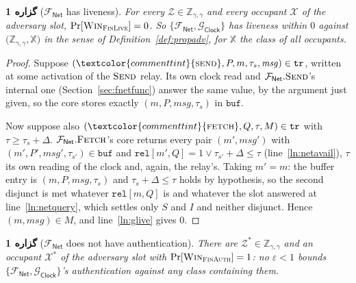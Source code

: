 \documentclass[10pt,oneside,openany]{book}
\newcommand{\Zenv}{\mathcal{Z}}
\newcommand{\ZenvSet}{\mathbb{Z}}
\newcommand{\op}[1]{\textnormal{\textsc{#1}}}
\newcommand{\atom}[1]{\textcolor{commenttint}{\op{#1}}}
\newcommand{\Xset}{\mathbb{X}}
\newcommand{\Win}{\op{Win}}
\newcommand{\Gclock}{\mathcal{G}_{\mathsf{Clock}}}
\newcommand{\Fnet}{\mathcal{F}_{\mathsf{Net}}}
\newcommand{\msg}{\mathit{msg}}
\newcommand{\V}[1]{\mathtt{#1}}
\theoremstyle{accentdef}
\theoremstyle{accentplain}
\newtheorem{proposition}[definition]{گزاره}
\begin{document}
\begin{proposition}[$\Fnet$ has liveness]\label{prop:netlive}
For every $\Zenv \in \ZenvSet_{\gamma,\gamma}$ and every occupant $\mathcal{X}$ of the adversary
slot, $\Pr[\Win_{\op{FinLive}}] = 0$. So $\{\Fnet,\Gclock\}$ has liveness within $0$ against
$\bigl(\ZenvSet_{\gamma,\gamma},\Xset\bigr)$ in the sense of Definition~\ref{def:propadv}, for
$\Xset$ the class of all occupants.
\end{proposition}

\begin{proof}
Suppose $(\atom{send},P,m,\tau_s,\msg) \in \V{tr}$, written at some activation of the $\op{Send}$
relay. Its own clock read and $\Fnet.\op{Send}$'s internal one (Section~\ref{sec:fnetfunc})
answer the same value, by the argument just given, so the core stores exactly $(m,P,\msg,\tau_s)$
in $\V{buf}$.

Now suppose also $(\atom{fetch},Q,\tau,M) \in \V{tr}$ with $\tau \geq \tau_s + \Delta$.
$\Fnet.\op{Fetch}$'s core returns every pair $(m',\msg')$ with $(m',P',\msg',\tau_{s'}) \in \V{buf}$
and $\V{rel}[m',Q] = 1 \vee \tau_{s'} + \Delta \leq \tau$ (line~\ref{ln:netavail}), $\tau$ its own
reading of the clock and, again, the relay's. Taking $m' = m$: the buffer entry is
$(m,P,\msg,\tau_s)$ and $\tau_s + \Delta \leq \tau$ holds by hypothesis, so the second disjunct is
met whatever $\V{rel}[m,Q]$ is and whatever the slot answered at line~\ref{ln:netquery}, which
settles only $S$ and $I$ and neither disjunct. Hence $(m,\msg) \in M$, and line~\ref{ln:glive}
gives $0$.
\end{proof}

\begin{proposition}[$\Fnet$ does not have authentication]\label{prop:netauth}
There are $\Zenv^{*} \in \ZenvSet_{\gamma,\gamma}$ and an occupant $\mathcal{X}^{*}$ of the
adversary slot with $\Pr[\Win_{\op{FinAuth}}] = 1$: no $\varepsilon < 1$ bounds
$\{\Fnet,\Gclock\}$'s
authentication against any class containing them.
\end{proposition}
\end{document}
